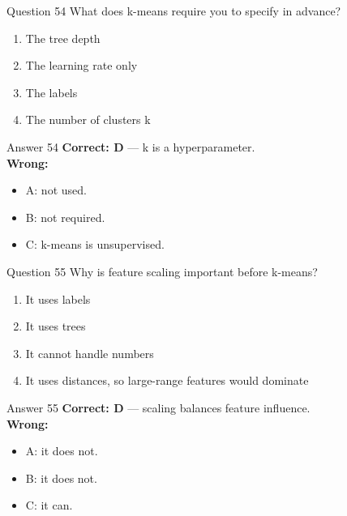 \documentclass[aspectratio=169,11pt]{beamer}
\begin{document}
\begin{frame}{Question 54}
What does k-means require you to specify in advance?
\begin{enumerate}[label=\Alph*.]
\item The tree depth
\item The learning rate only
\item The labels
\item The number of clusters k
\end{enumerate}
\end{frame}
\begin{frame}{Answer 54}
\textbf{Correct: D} --- k is a hyperparameter.\\
\vspace{0.5em}
\textbf{Wrong:}
\begin{itemize}
\item A: not used.
\item B: not required.
\item C: k-means is unsupervised.
\end{itemize}
\end{frame}

\begin{frame}{Question 55}
Why is feature scaling important before k-means?
\begin{enumerate}[label=\Alph*.]
\item It uses labels
\item It uses trees
\item It cannot handle numbers
\item It uses distances, so large-range features would dominate
\end{enumerate}
\end{frame}
\begin{frame}{Answer 55}
\textbf{Correct: D} --- scaling balances feature influence.\\
\vspace{0.5em}
\textbf{Wrong:}
\begin{itemize}
\item A: it does not.
\item B: it does not.
\item C: it can.
\end{itemize}
\end{frame}
\end{document}
